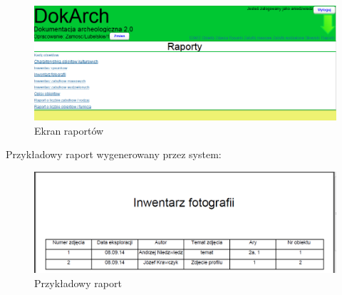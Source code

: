 \begin{figure} [H]
    \begin{center}
	\includegraphics[scale=.6]{img/ekranRaportow.png}
	\caption{Ekran raportów}
	\label{listaRaportow}
    \end{center}
\end{figure}
\newpage
Przykładowy raport wygenerowany przez system:

\begin{figure} [H]
    \begin{center}
	\includegraphics[scale=.6]{img/przykladowyRaport.png}
	\caption{Przykładowy raport}
	\label{przykladowyRaport}
    \end{center}
\end{figure}

